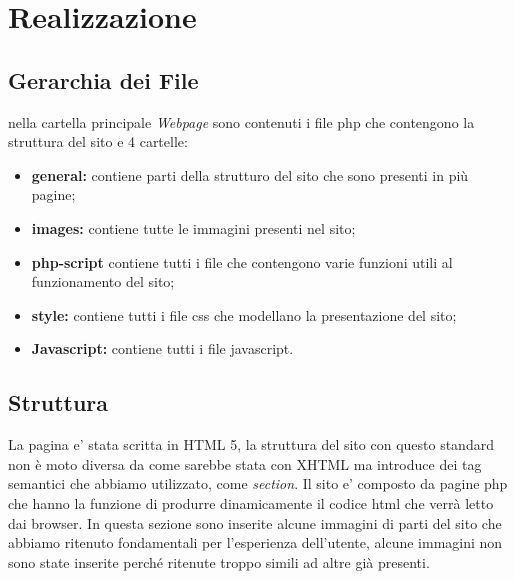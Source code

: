 \section{Realizzazione}
\subsection{Gerarchia dei File}
nella cartella principale \textit{Webpage} sono contenuti i file php che contengono la struttura del sito e 4 cartelle:
\begin{itemize}
	\item \textbf{general:} contiene parti della strutturo del sito che sono presenti in più pagine;
	\item \textbf{images:} contiene tutte le immagini presenti nel sito;
	\item \textbf{php-script} contiene tutti i file che contengono varie funzioni utili al funzionamento del sito;
	\item \textbf{style:} contiene tutti i file css che modellano la presentazione del sito;
	\item \textbf{Javascript:} contiene tutti i file javascript.
\end{itemize}
\subsection{Struttura}
La pagina e' stata scritta in HTML 5, la struttura del sito con questo standard non è moto diversa da come sarebbe stata con XHTML ma introduce dei tag semantici che abbiamo utilizzato, come \emph{section}.\newline
Il sito e' composto da pagine php che hanno la funzione di produrre dinamicamente il codice html che verrà letto dai browser.\newline
In questa sezione sono inserite alcune immagini di parti del sito che abbiamo ritenuto fondamentali per l'esperienza dell'utente, alcune immagini non sono state inserite perché ritenute troppo simili ad altre già presenti. 


